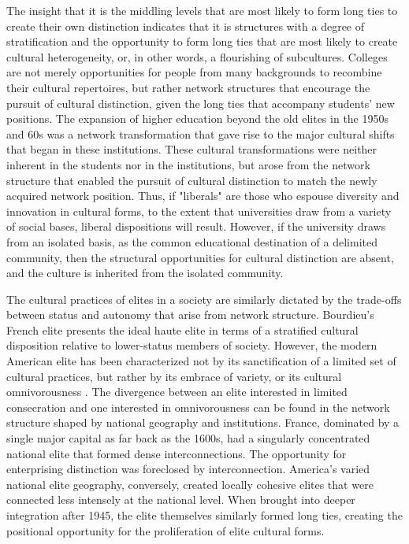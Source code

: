 \documentclass[12pt]{article}
\begin{document}
The insight that it is the middling levels that are most likely to form long ties to create their own distinction indicates that it is structures with a degree of stratification and the opportunity to form long ties that are most likely to create cultural heterogeneity, or, in other words, a flourishing of subcultures. Colleges are not merely opportunities for people from many backgrounds to recombine their cultural repertoires, but rather network structures that encourage the pursuit of cultural distinction, given the long ties that accompany students' new positions. The expansion of higher education beyond the old elites in the 1950s and 60s was a network transformation that gave rise to the major cultural shifts that began in these institutions. These cultural transformations were neither inherent in the students nor in the institutions, but arose from the network structure that enabled the pursuit of cultural distinction to match the newly acquired network position. Thus, if "liberals" are those who espouse diversity and innovation in cultural forms, to the extent that universities draw from a variety of social bases, liberal dispositions will result. However, if the university draws from an isolated basis, as the common educational destination of a delimited community, then the structural opportunities for cultural distinction are absent, and the culture is inherited from the isolated community.   

The cultural practices of elites in a society are similarly dictated by the trade-offs between status and autonomy that arise from network structure. Bourdieu's French elite presents the ideal haute elite in terms of a stratified cultural disposition relative to lower-status members of society. However, the modern American elite has been characterized not by its sanctification of a limited set of cultural practices, but rather by its embrace of variety, or its cultural omnivorousness \citep{bryson1996anything}. The divergence between an elite interested in limited consecration and one interested in omnivorousness can be found in the network structure shaped by national geography and institutions. France, dominated by a single major capital as far back as the 1600s, had a singularly concentrated national elite that formed dense interconnections. The opportunity for enterprising distinction was foreclosed by interconnection. America's varied national elite geography, conversely, created locally cohesive elites that were connected less intensely at the national level. When brought into deeper integration after 1945, the elite themselves similarly formed long ties, creating the positional opportunity for the proliferation of elite cultural forms.      
\end{document}
